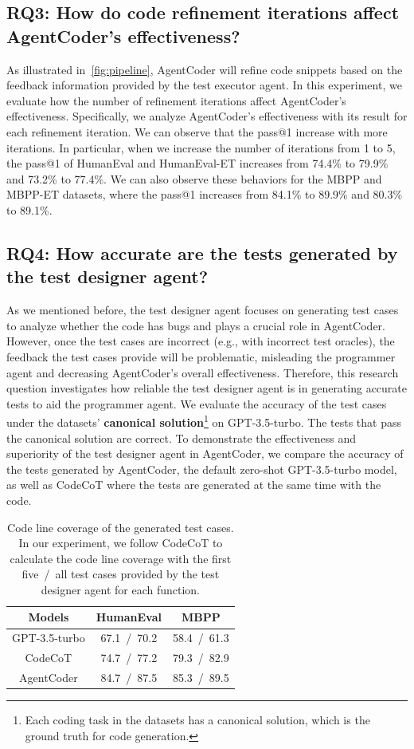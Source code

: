 \documentclass[manuscript,screen,review]{acmart}
\newcommand{\xxx}{AgentCoder\xspace}
\begin{document}
\subsection{RQ3: How do code refinement iterations affect \xxx's effectiveness?}
As illustrated in~\cref{fig:pipeline}, \xxx will refine code snippets based on the feedback information provided by the test executor agent. In this experiment, we evaluate how the number of refinement iterations affect \xxx's effectiveness. Specifically, we analyze \xxx's effectiveness with its result for each refinement iteration. We can observe that the pass@1 increase with more iterations. In particular, when we increase the number of iterations from 1 to 5, the pass@1 of HumanEval and HumanEval-ET increases from 74.4\% to 79.9\% and 73.2\% to 77.4\%. We can also observe these behaviors for the MBPP and MBPP-ET datasets, where the pass@1 increases from 84.1\% to 89.9\% and 80.3\% to 89.1\%. 



\subsection{RQ4: How accurate are the tests generated by the test designer agent?}
As we mentioned before, the test designer agent focuses on generating test cases to analyze whether the code has bugs and plays a crucial role in \xxx. However, once the test cases are incorrect (e.g., with incorrect test oracles), the feedback the test cases provide will be problematic, misleading the programmer agent and decreasing \xxx's overall effectiveness. 
Therefore, this research question investigates how reliable the test designer agent is in generating accurate tests to aid the programmer agent. 
We evaluate the accuracy of the test cases under the datasets' \textbf{canonical solution}\footnote{Each coding task in the datasets has a canonical solution, which is the ground truth for code generation.} on GPT-3.5-turbo. The tests that pass the canonical solution are correct. 
To demonstrate the effectiveness and superiority of the test designer agent in \xxx, we compare the accuracy of the tests generated by \xxx, the default zero-shot GPT-3.5-turbo model, as well as CodeCoT where the tests are generated at the same time with the code. 

\begin{table}
    \centering
    \caption{Code line coverage of the generated test cases. In our experiment, we follow CodeCoT to calculate the code line coverage with the first five~/~all test cases provided by the test designer agent for each function.}
    \begin{tabular}{c|cc}
    \toprule
    Models&HumanEval&MBPP\\
    \midrule
    GPT-3.5-turbo&67.1~/~70.2&58.4~/~61.3\\
    CodeCoT&74.7~/~77.2&79.3~/~82.9\\
         \xxx&84.7~/~87.5&85.3~/~89.5\\
         \bottomrule
    \end{tabular}
    \label{tab:coverage}
\end{table}
\end{document}

